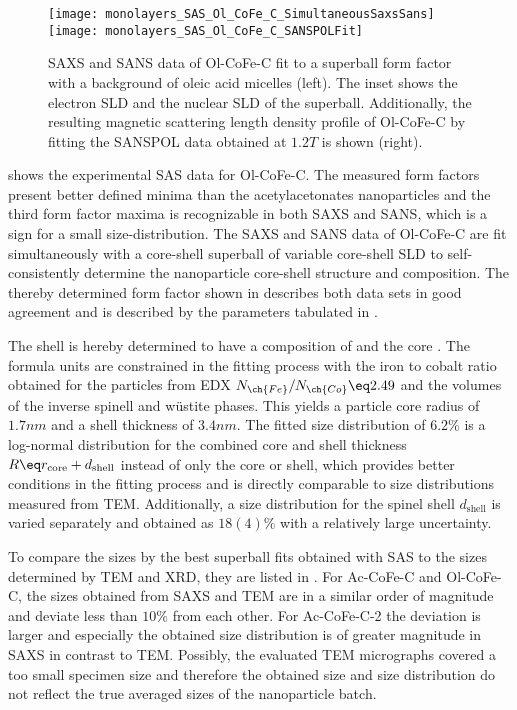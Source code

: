 \documentclass[\main/dresen_thesis.tex]{subfiles}
\begin{document}
    \begin{figure}[tb]
      \centering
      \texttt{[image: monolayers\_SAS\_Ol\_CoFe\_C\_SimultaneousSaxsSans]}
      \texttt{[image: monolayers\_SAS\_Ol\_CoFe\_C\_SANSPOLFit]}
      \caption{\label{fig:monolayers:nanoparticle:sas:OlCoFeC}SAXS and SANS data of Ol-CoFe-C fit to a superball form factor with a background of oleic acid micelles (left). The inset shows the electron SLD and the nuclear SLD of the superball. Additionally, the resulting magnetic scattering length density profile of Ol-CoFe-C by fitting the SANSPOL data obtained at $1.2 \unit{T}$ is shown (right).}
    \end{figure}

     shows the experimental SAS data for Ol-CoFe-C.
    The measured form factors present better defined minima than the acetylacetonates nanoparticles and the third form factor maxima is recognizable in both SAXS and SANS, which is a sign for a small size-distribution.
    The SAXS and SANS data of Ol-CoFe-C are fit simultaneously with a core-shell superball of variable core-shell SLD to self-consistently determine the nanoparticle core-shell structure and composition.
    The thereby determined form factor shown in  describes both data sets in good agreement and is described by the parameters tabulated in .

    The shell is hereby determined to have a composition of  and the core .
    The formula units are constrained in the fitting process with the iron to cobalt ratio obtained for the particles from EDX $N_{\ch{Fe}} / N_{\ch{Co}} \eq 2.49$ and the volumes of the inverse spinell and w\"ustite phases.
    This yields a particle core radius of $1.7 \unit{nm}$ and a shell thickness of $3.4 \unit{nm}$.
    The fitted size distribution of $6.2 \%$ is a log-normal distribution for the combined core and shell thickness $R \eq r_\mathrm{core} + d_\mathrm{shell}$ instead of only the core or shell, which provides better conditions in the fitting process and is directly comparable to size distributions measured from TEM.
    Additionally, a size distribution for the spinel shell $d_\mathrm{shell}$ is varied separately and obtained as $18(4) \%$ with a relatively large uncertainty.

    To compare the sizes by the best superball fits obtained with SAS to the sizes determined by TEM and XRD, they are listed in .
    For Ac-CoFe-C and Ol-CoFe-C, the sizes obtained from SAXS and TEM are in a similar order of magnitude and deviate less than $10 \%$ from each other.
    For Ac-CoFe-C-2 the deviation is larger and especially the obtained size distribution is of greater magnitude in SAXS in contrast to TEM.
    Possibly, the evaluated TEM micrographs covered a too small specimen size and therefore the obtained size and size distribution do not reflect the true averaged sizes of the nanoparticle batch.
\end{document}
